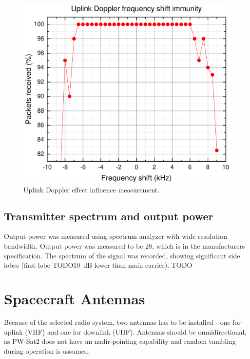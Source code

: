 \begin{figure}
    \centering
    \includegraphics[width=0.6\paperwidth]{img/4/uplink_doppler.pdf}
    \caption{Uplink Doppler effect influence measurement.}
    \label{4_uplink_doppler_measurement}
\end{figure}


\subsection{Transmitter spectrum and output power}
Output power was measured using spectrum analyzer with wide resolution bandwidth. Output power was measured to be \SI{28}{\dBm}, which is in the manufacturers specification.
The spectrum of the signal was recorded, showing significant side lobes (first lobe TODO\SI{10}{\dB} lower than main carrier).
TODO








\section{Spacecraft Antennas}
Because of the selected radio system, two antennas has to be installed - one for uplink (VHF) and one for downlink (UHF). Antennas should be omnidirectional, as PW-Sat2 does not have an nadir-pointing capability and random tumbling during operation is assumed.

